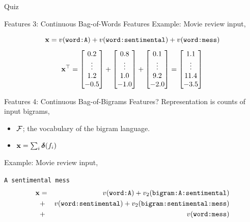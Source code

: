 \documentclass{beamer}
\begin{document}
\begin{frame}{Quiz}
\begin{itemize}
\begin{frame}{Features 3: Continuous Bag-of-Words Features}
  Example: Movie review input, 
  \begin{center}
    \[\mathbf{x} = v(\texttt{word:A}) + v(\texttt{word:sentimental}) + v(\texttt{word:mess})\]
    \[ \mathbf{x}^\top = \begin{bmatrix} 0.2 \\ \vdots \\ 1.2 \\ -0.5 \\ \end{bmatrix} + \begin{bmatrix} 0.8 \\ \vdots \\ 1.0\\ -1.0 \\ \end{bmatrix} +
     \begin{bmatrix} 0.1 \\ \vdots \\ 9.2 \\ -2.0 \\ \end{bmatrix} 
    =  \begin{bmatrix} 1.1 \\ \vdots \\ 11.4 \\ -3.5 \\ \end{bmatrix} 
     \]
  \end{center}
\end{frame}

\begin{frame}{Features 4: Continuous Bag-of-Bigrams Features?}
  Representation is counts of input bigrams, 
  \begin{itemize}
  \item $\mathcal{F}$; the vocabulary of the bigram language.
  \item $\mathbf{x} = \sum_{i} \boldsymbol{\delta}(f_i)$ 
  \end{itemize}

  Example: Movie review input, 
  \begin{center}
    \texttt{A sentimental mess}
    \begin{eqnarray*}
      \mathbf{x} &=& v(\texttt{word:A})+ v_2(\texttt{bigram:A:sentimental}) \\
      &+&  v(\texttt{word:sentimental}) +   v_2(\texttt{bigram:sentimental:mess})  \\
      &+& v(\texttt{word:mess})
    \end{eqnarray*}


\end{center}
\end{frame}
\end{itemize}
\end{frame}
\end{document}
